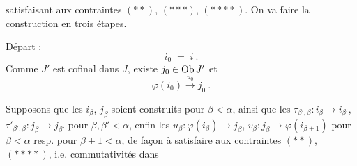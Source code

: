 \dgrchunkbegin

satisfaisant aux contraintes $(**)$, $(***)$, $(****)$. On va faire la construction en trois étapes.

 Départ :
\[
i_0 \;=\; i\ .
\]
Comme $J'$ est cofinal dans $J$, existe $j_0\in\operatorname{Ob} J'$ et
\[
\varphi(i_0)\xrightarrow{u_0} j_0\ .
\]


 Supposons que les $i_\beta$, $j_\beta$ soient construits pour $\beta<\alpha$, ainsi que les $\tau_{\beta',\beta}:i_\beta\longrightarrow i_{\beta'}$, $\tau'_{\beta',\beta}:j_\beta\longrightarrow j_{\beta'}$ pour $\beta,\beta'<\alpha$, enfin les $u_\beta:\varphi(i_\beta)\longrightarrow j_\beta$, $v_\beta:j_\beta\longrightarrow\varphi(i_{\beta+1})$ pour $\beta<\alpha$ resp. pour $\beta+1<\alpha$, de façon à satisfaire aux contraintes $(**)$, $(****)$, i.e. commutativités dans
